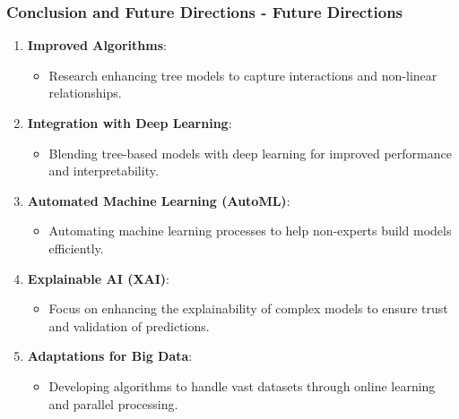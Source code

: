 \documentclass{beamer}
\begin{document}
\begin{frame}[fragile]
    \frametitle{Conclusion and Future Directions - Future Directions}

    \begin{enumerate}
        \item \textbf{Improved Algorithms}:
        \begin{itemize}
            \item Research enhancing tree models to capture interactions and non-linear relationships.
        \end{itemize}

        \item \textbf{Integration with Deep Learning}:
        \begin{itemize}
            \item Blending tree-based models with deep learning for improved performance and interpretability.
        \end{itemize}

        \item \textbf{Automated Machine Learning (AutoML)}:
        \begin{itemize}
            \item Automating machine learning processes to help non-experts build models efficiently.
        \end{itemize}

        \item \textbf{Explainable AI (XAI)}:
        \begin{itemize}
            \item Focus on enhancing the explainability of complex models to ensure trust and validation of predictions.
        \end{itemize}

        \item \textbf{Adaptations for Big Data}:
        \begin{itemize}
            \item Developing algorithms to handle vast datasets through online learning and parallel processing.
        \end{itemize}
    \end{enumerate}

\end{frame}
\end{document}
